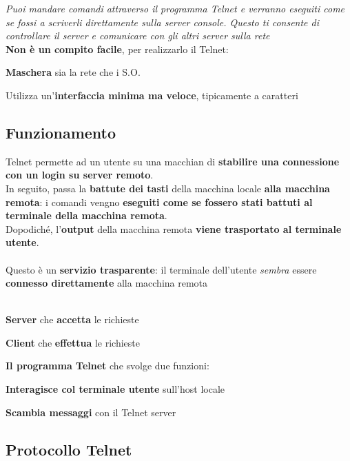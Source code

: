 \documentclass[10pt]{article}
\begin{document}
\textit{Puoi mandare comandi attraverso il programma Telnet e verranno eseguiti come se fossi a scriverli direttamente sulla server console. Questo ti consente di controllare il server e comunicare con gli altri server sulla rete}\\
\textbf{Non è un compito facile}, per realizzarlo il Telnet:
\begin{list}{}{}
\item \textbf{Maschera} sia la rete che i S.O.
\item Utilizza un'\textbf{interfaccia minima ma veloce}, tipicamente a caratteri
\end{list}
\subsection{Funzionamento}
Telnet permette ad un utente su una macchian di \textbf{stabilire una connessione con un login su server remoto}.\\In seguito, passa la \textbf{battute dei tasti} della macchina locale \textbf{alla macchina remota}: i comandi vengno \textbf{eseguiti come se fossero stati battuti al terminale della macchina remota}.\\Dopodiché, l'\textbf{output} della macchina remota \textbf{viene trasportato al terminale utente}.\\\\
Questo è un \textbf{servizio trasparente}: il terminale dell'utente \textit{sembra} essere \textbf{connesso direttamente} alla macchina remota\\\\
\begin{list}{}{Il modello di Telnet include:}
\item \textbf{Server} che \textbf{accetta} le richieste
\item \textbf{Client} che \textbf{effettua} le richieste
\item \textbf{Il programma Telnet} che svolge due funzioni:
\begin{list}{}{}
\item \textbf{Interagisce col terminale utente} sull'host locale
\item \textbf{Scambia messaggi} con il Telnet server
\end{list}
\end{list}
\subsection{Protocollo Telnet}
\end{document}
